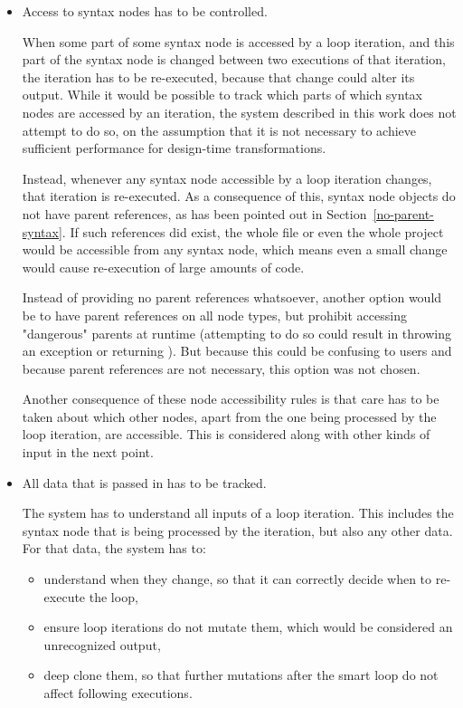 \begin{itemize}
\item Access to syntax nodes has to be controlled.

\nopagebreak

When some part of some syntax node is accessed by a loop iteration, and this part of the syntax node is changed between two executions of that iteration, the iteration has to be re-executed, because that change could alter its output. While it would be possible to track which parts of which syntax nodes are accessed by an iteration, the system described in this work does not attempt to do so, on the assumption that it is not necessary to achieve sufficient performance for design-time transformations.

\label{no-parent-transform}
Instead, whenever any syntax node accessible by a loop iteration changes, that iteration is re-executed. As a consequence of this, syntax node objects do not have parent references, as has been pointed out in Section~\ref{no-parent-syntax}. If such references did exist, the whole file or even the whole project would be accessible from any syntax node, which means even a small change would cause re-execution of large amounts of code.

Instead of providing no parent references whatsoever, another option would be to have parent references on all node types, but prohibit accessing "dangerous" parents at runtime (attempting to do so could result in throwing an exception or returning ). But because this could be confusing to users and because parent references are not necessary, this option was not chosen.

Another consequence of these node accessibility rules is that care has to be taken about which other nodes, apart from the one being processed by the loop iteration, are accessible. This is considered along with other kinds of input in the next point.

\item All data that is passed in has to be tracked.

\nopagebreak

The system has to understand all inputs of a loop iteration. This includes the syntax node that is being processed by the iteration, but also any other data. For that data, the system has to:

\begin{itemize}
\item understand when they change, so that it can correctly decide when to re-execute the loop,
\item ensure loop iterations do not mutate them, which would be considered an unrecognized output,
\item deep clone them, so that further mutations after the smart loop do not affect following executions.
\end{itemize}


\end{itemize}

